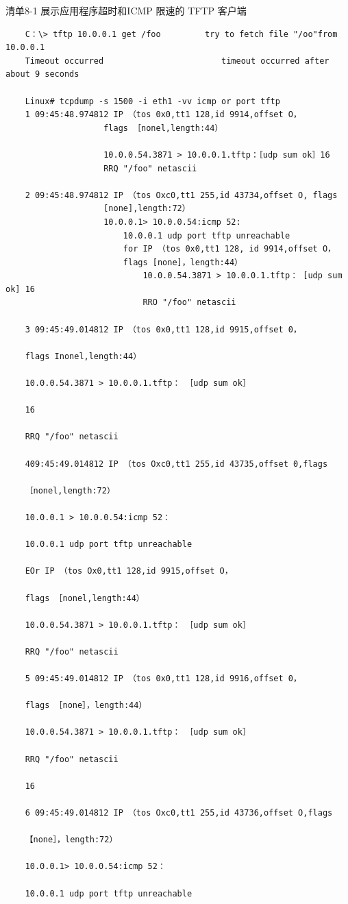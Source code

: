 清单8-1 展示应用程序超时和ICMP 限速的 TFTP 客户端

\begin{verbatim}
	C：\> tftp 10.0.0.1 get /foo			try to fetch file "/oo"from 10.0.0.1
	Timeout occurred						timeout occurred after about 9 seconds

	Linux# tcpdump -s 1500 -i eth1 -vv icmp or port tftp
	1 09:45:48.974812 IP （tos 0x0,tt1 128,id 9914,offset O，
					flags ［nonel,length:44）

					10.0.0.54.3871 > 10.0.0.1.tftp：［udp sum ok］16
					RRQ "/foo" netascii

	2 09:45:48.974812 IP （tos Oxc0,tt1 255,id 43734,offset O, flags
					[none],length:72）
					10.0.0.1> 10.0.0.54:icmp 52:
						10.0.0.1 udp port tftp unreachable
						for IP （tos 0x0,tt1 128, id 9914,offset O，
						flags [none]，length:44）
							10.0.0.54.3871 > 10.0.0.1.tftp： [udp sum ok] 16
							RRO "/foo" netascii

	3 09:45:49.014812 IP （tos 0x0,tt1 128,id 9915,offset 0，

	flags Inonel,length:44）

	10.0.0.54.3871 > 10.0.0.1.tftp： ［udp sum ok］

	16

	RRQ "/foo" netascii

	409:45:49.014812 IP （tos Oxc0,tt1 255,id 43735,offset 0,flags

	［nonel,length:72）

	10.0.0.1 > 10.0.0.54:icmp 52：

	10.0.0.1 udp port tftp unreachable

	EOr IP （tos Ox0,tt1 128,id 9915,offset O，

	flags ［nonel,length:44）

	10.0.0.54.3871 > 10.0.0.1.tftp： ［udp sum ok］

	RRQ "/foo" netascii

	5 09:45:49.014812 IP （tos 0x0,tt1 128,id 9916,offset 0，

	flags ［none］，length:44）

	10.0.0.54.3871 > 10.0.0.1.tftp： ［udp sum ok］

	RRQ "/foo" netascii

	16

	6 09:45:49.014812 IP （tos Oxc0,tt1 255,id 43736,offset O,flags

	【none］，length:72）

	10.0.0.1> 10.0.0.54:icmp 52：

	10.0.0.1 udp port tftp unreachable


\end{verbatim}
